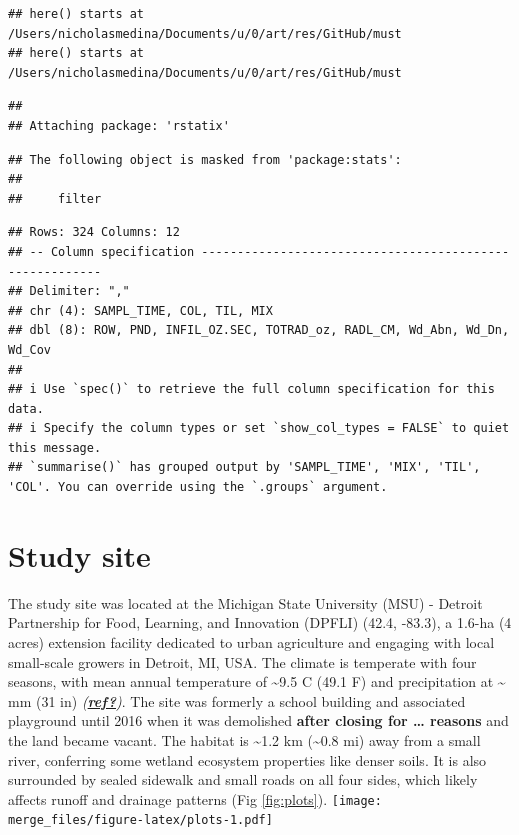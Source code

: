 \documentclass[
]{article}
\begin{document}
\begin{verbatim}
## here() starts at /Users/nicholasmedina/Documents/u/0/art/res/GitHub/must
## here() starts at /Users/nicholasmedina/Documents/u/0/art/res/GitHub/must
\end{verbatim}

\begin{verbatim}
## 
## Attaching package: 'rstatix'
\end{verbatim}

\begin{verbatim}
## The following object is masked from 'package:stats':
## 
##     filter
\end{verbatim}

\begin{verbatim}
## Rows: 324 Columns: 12
## -- Column specification --------------------------------------------------------
## Delimiter: ","
## chr (4): SAMPL_TIME, COL, TIL, MIX
## dbl (8): ROW, PND, INFIL_OZ.SEC, TOTRAD_oz, RADL_CM, Wd_Abn, Wd_Dn, Wd_Cov
## 
## i Use `spec()` to retrieve the full column specification for this data.
## i Specify the column types or set `show_col_types = FALSE` to quiet this message.
## `summarise()` has grouped output by 'SAMPL_TIME', 'MIX', 'TIL', 'COL'. You can override using the `.groups` argument.
\end{verbatim}

\hypertarget{study-site}{%
\section{Study site}\label{study-site}}

The study site was located at the Michigan State University (MSU) - Detroit Partnership for Food, Learning, and Innovation (DPFLI) (42.4, -83.3), a 1.6-ha (4 acres) extension facility dedicated to urban agriculture and engaging with local small-scale growers in Detroit, MI, USA.
The climate is temperate with four seasons, with mean annual temperature of \textasciitilde9.5 C (49.1 F) and precipitation at \textasciitilde{} mm (31 in) \emph{(\protect\hyperlink{ref-ref}{\textbf{ref?}})}.
The site was formerly a school building and associated playground until 2016 when it was demolished \textbf{after closing for \ldots{} reasons} and the land became vacant.
The habitat is \textasciitilde1.2 km (\textasciitilde0.8 mi) away from a small river, conferring some wetland ecosystem properties like denser soils.
It is also surrounded by sealed sidewalk and small roads on all four sides, which likely affects runoff and drainage patterns (Fig \ref{fig:plots}).
\texttt{[image: merge\_files/figure-latex/plots-1.pdf]}
\end{document}
